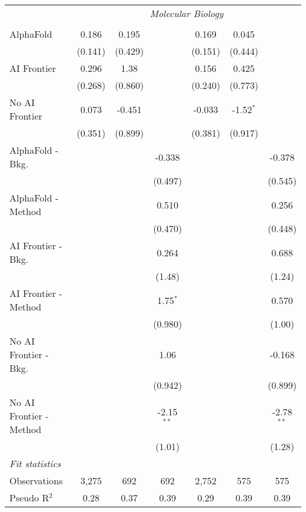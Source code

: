 \begin{tabular}{lcccccc}
 & \multicolumn{6}{c}{\textit{Molecular Biology}} \\ \\
   AlphaFold               & 0.186   & 0.195   &              & 0.169   & 0.045       &   \\   
                           & (0.141) & (0.429) &              & (0.151) & (0.444)     &   \\   
   AI Frontier             & 0.296   & 1.38    &              & 0.156   & 0.425       &   \\   
                           & (0.268) & (0.860) &              & (0.240) & (0.773)     &   \\   
   No AI Frontier          & 0.073   & -0.451  &              & -0.033  & -1.52$^{*}$ &   \\   
                           & (0.351) & (0.899) &              & (0.381) & (0.917)     &   \\   
   AlphaFold - Bkg.        &         &         & -0.338       &         &             & -0.378\\   
                           &         &         & (0.497)      &         &             & (0.545)\\   
   AlphaFold - Method      &         &         & 0.510        &         &             & 0.256\\   
                           &         &         & (0.470)      &         &             & (0.448)\\   
   AI Frontier - Bkg.      &         &         & 0.264        &         &             & 0.688\\   
                           &         &         & (1.48)       &         &             & (1.24)\\   
   AI Frontier - Method    &         &         & 1.75$^{*}$   &         &             & 0.570\\   
                           &         &         & (0.980)      &         &             & (1.00)\\   
   No AI Frontier - Bkg.   &         &         & 1.06         &         &             & -0.168\\   
                           &         &         & (0.942)      &         &             & (0.899)\\   
   No AI Frontier - Method &         &         & -2.15$^{**}$ &         &             & -2.78$^{**}$\\   
                           &         &         & (1.01)       &         &             & (1.28)\\   
   \midrule
   \emph{Fit statistics}\\
   Observations            & 3,275   & 692     & 692          & 2,752   & 575         & 575\\  
   Pseudo R$^2$            & 0.28    & 0.37    & 0.39         & 0.29    & 0.39        & 0.39\\  
   

\end{tabular}

